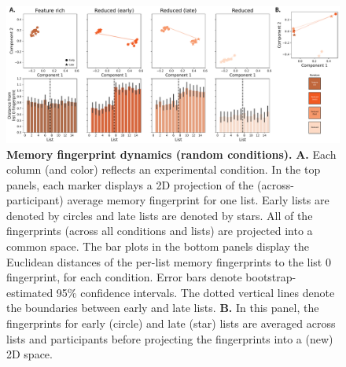\documentclass{article}
\begin{document}
\begin{figure}[tp] \centering
    \includegraphics[width=\textwidth]{figures/fingerprint_trajectories_random}
    
    \caption{\textbf{Memory fingerprint dynamics (random conditions).}
    \textbf{A.} Each column (and color) reflects an experimental condition. In
    the top panels, each marker displays a 2D projection of the
    (across-participant) average memory fingerprint for one list. Early lists
    are denoted by circles and late lists are denoted by stars. All of the
    fingerprints (across all conditions and lists) are projected into a common
    space. The bar plots in the bottom panels display the Euclidean distances
    of the per-list memory fingerprints to the list 0 fingerprint, for each
    condition. Error bars denote bootstrap-estimated 95\% confidence intervals.
    The dotted vertical lines denote the boundaries between early and late
    lists. \textbf{B.} In this panel, the fingerprints for early (circle) and
    late (star) lists are averaged across lists and participants before
    projecting the fingerprints into a (new) 2D space.} \label{fig:fingerprint-trajectories-random}
    
    \end{figure}




%
%
\end{document}
